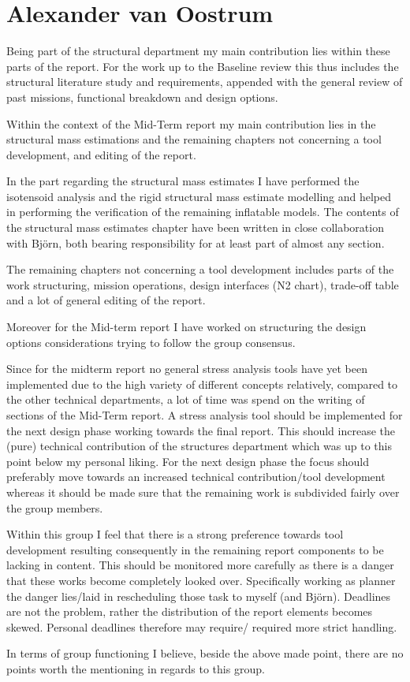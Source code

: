 \section{Alexander van Oostrum}

Being part of the structural department my main contribution lies within these parts of the report. For the work up to the Baseline review this thus includes the structural literature study and requirements, appended with the general review of past missions, functional breakdown and design options. 

Within the context of the Mid-Term report my main contribution lies in the structural mass estimations and the remaining chapters not concerning a tool development, and editing of the report.

In the part regarding the structural mass estimates I have performed the isotensoid analysis and the rigid structural mass estimate modelling and helped in performing the verification of the remaining inflatable models.  The contents of the structural mass estimates chapter have been written in close collaboration with Bj\"{o}rn, both bearing responsibility for at least part of almost any section.

The remaining chapters not concerning a tool development includes parts of the work structuring, mission operations, design interfaces (N2 chart), trade-off table and a lot of general editing of the report.

Moreover for the Mid-term report I have worked on structuring the design options considerations trying to follow the group consensus.

Since for the midterm report no general stress analysis tools have yet been implemented due to the high variety of different concepts relatively, compared to the other technical departments, a lot of time was spend on the writing of sections of the Mid-Term report.  A stress analysis tool should be implemented for the next design phase working towards the final report. This should increase the (pure) technical contribution of the structures department which was up to this point below my personal liking. For the next design phase the focus should preferably move towards an increased technical contribution/tool development whereas it should be made sure that the remaining work is subdivided fairly over the group members.

Within this group I feel that there is a strong preference towards tool development resulting consequently in the remaining report components to be lacking in content. This should be monitored more carefully as there is a danger that these works become completely looked over. Specifically working as planner the danger lies/laid in rescheduling those task to myself (and Bj\"{o}rn). Deadlines are not the problem, rather the distribution of the report elements becomes skewed. Personal deadlines therefore may require/ required more strict handling. 

In terms of group functioning I believe, beside the above made point, there are no points worth the mentioning in regards to this group. 
 
